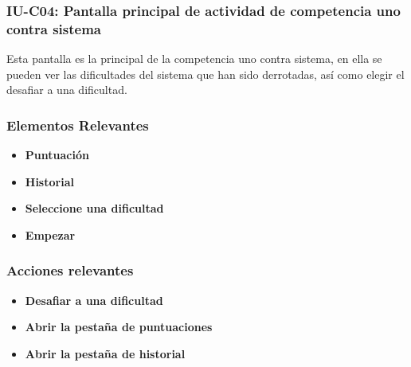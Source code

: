 
\subsubsection{IU-C04: Pantalla principal de actividad de competencia uno contra sistema}

Esta pantalla es la principal de la competencia uno contra sistema, en ella se pueden ver las dificultades del sistema que han sido derrotadas, así como elegir el desafiar a una dificultad.


        \subsubsection{Elementos Relevantes}

            \begin{itemize}
            \item {\bf Puntuación}
            \item {\bf Historial}
            \item {\bf Seleccione una dificultad}
            \item {\bf Empezar}
            \end{itemize}

        \subsubsection{Acciones relevantes}

            \begin{itemize}
            \item {\bf Desafiar a una dificultad}
            \item {\bf Abrir la pestaña de puntuaciones}
            \item {\bf Abrir la pestaña de historial}
            \end{itemize}

        \clearpage
